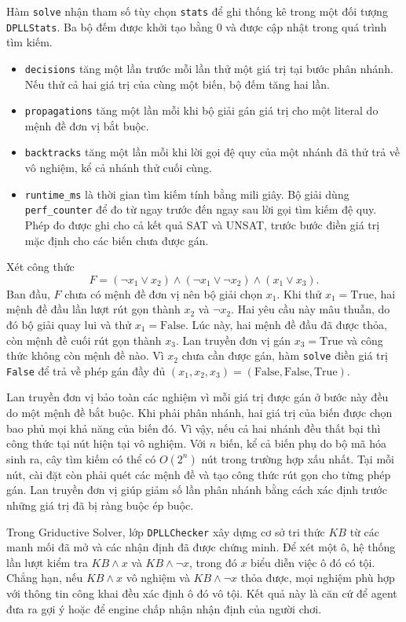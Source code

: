 Hàm \texttt{solve} nhận tham số tùy chọn \texttt{stats} để ghi
thống kê trong một đối tượng \texttt{DPLLStats}. Ba bộ đếm được
khởi tạo bằng 0 và được cập nhật trong quá trình tìm kiếm.

\begin{itemize}
    \item \texttt{decisions} tăng một lần trước mỗi lần thử một
    giá trị tại bước phân nhánh. Nếu thử cả hai giá trị của cùng
    một biến, bộ đếm tăng hai lần.
    \item \texttt{propagations} tăng một lần mỗi khi bộ giải gán
    giá trị cho một literal do mệnh đề đơn vị bắt buộc.
    \item \texttt{backtracks} tăng một lần mỗi khi lời gọi đệ quy
    của một nhánh đã thử trả về vô nghiệm, kể cả nhánh thử cuối cùng.
    \item \texttt{runtime\_ms} là thời gian tìm kiếm tính bằng
    mili giây. Bộ giải dùng \texttt{perf\_counter} để đo từ ngay
    trước đến ngay sau lời gọi tìm kiếm đệ quy. Phép đo được ghi
    cho cả kết quả SAT và UNSAT, trước bước điền giá trị mặc định
    cho các biến chưa được gán.
\end{itemize}
Xét công thức
\[
F=(\neg x_1 \lor x_2)
  \land(\neg x_1 \lor \neg x_2)
  \land(x_1 \lor x_3).
\]
Ban đầu, $F$ chưa có mệnh đề đơn vị nên bộ giải chọn $x_1$. Khi thử
$x_1=\mathrm{True}$, hai mệnh đề đầu lần lượt rút gọn thành $x_2$ và
$\neg x_2$. Hai yêu cầu này mâu thuẫn, do đó bộ giải quay lui và thử
$x_1=\mathrm{False}$. Lúc này, hai mệnh đề đầu đã được thỏa, còn mệnh
đề cuối rút gọn thành $x_3$. Lan truyền đơn vị gán
$x_3=\mathrm{True}$ và công thức không còn mệnh đề nào. Vì $x_2$
chưa cần được gán, hàm \texttt{solve} điền giá trị \texttt{False}
để trả về phép gán đầy đủ
$(x_1,x_2,x_3)=(\mathrm{False},\mathrm{False},\mathrm{True})$.

Lan truyền đơn vị bảo toàn các nghiệm vì mỗi giá trị được gán ở
bước này đều do một mệnh đề bắt buộc. Khi phải phân nhánh, hai giá trị
của biến được chọn bao phủ mọi khả năng của biến đó. Vì vậy, nếu cả
hai nhánh đều thất bại thì công thức tại nút hiện tại vô nghiệm.
Với $n$ biến, kể cả biến phụ do bộ mã hóa sinh ra, cây tìm kiếm có
thể có $O(2^n)$ nút trong trường hợp xấu nhất. Tại mỗi nút, cài đặt
còn phải quét các mệnh đề và tạo công thức rút gọn cho từng phép gán.
Lan truyền đơn vị giúp giảm số lần phân nhánh bằng cách xác định trước
những giá trị đã bị ràng buộc ép buộc.

Trong Griductive Solver, lớp \texttt{DPLLChecker} xây dựng cơ sở tri
thức $KB$ từ các manh mối đã mở và các nhận định đã được chứng minh.
Để xét một ô, hệ thống lần lượt kiểm tra $KB\land x$ và
$KB\land\neg x$, trong đó $x$ biểu diễn việc ô đó có tội. Chẳng hạn,
nếu $KB\land x$ vô nghiệm và $KB\land\neg x$ thỏa được, mọi nghiệm
phù hợp với thông tin công khai đều xác định ô đó vô tội. Kết quả
này là căn cứ để agent đưa ra gợi ý hoặc để engine chấp nhận nhận
định của người chơi.